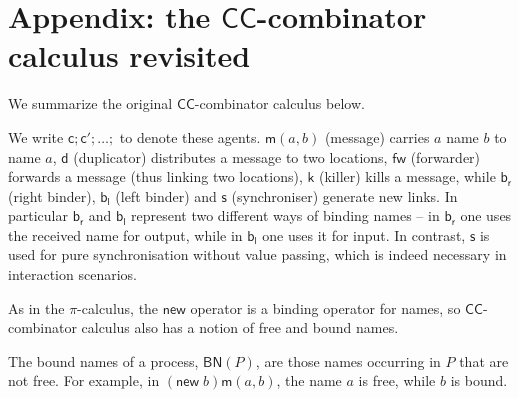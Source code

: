\documentclass[submission,copyright,creativecommons]{eptcs}
\newcommand{\new}{\mathsf{new}}
\newcommand{\pic}{$\pi$-calculus}
\newcommand{\ccomb}{$\mathsf{CC}$-combinator calculus}
\newcommand{\pzero}{\mathbin{0}}
\newcommand{\freenames}[1]{\mathbin{\mathsf{FN}(#1)}}
\newcommand{\boundnames}[1]{\mathbin{\mathsf{BN}(#1)}}
\newcommand{\bc}{\mathbin{\mathbf{::=}}}
\newcommand{\bm}{\mathbin{\mathbf\mid}}
\theoremstyle{definition}
\theoremstyle{remark}
\theoremstyle{remark}
\begin{document}



\section{Appendix: the {\ccomb} revisited} \label{appendix:ccomb}
We summarize the original {\ccomb} \cite{DBLP:journals/tcs/Yoshida02} below.


We write $\mathsf{c};\mathsf{c'};\ldots;$ to denote these
agents. $\mathsf{m}(a,b)$ (message) carries $a$ name $b$ to name $a$,
$\mathsf{d}$ (duplicator) distributes a message to two locations,
$\mathsf{fw}$ (forwarder) forwards a message (thus linking two
locations), $\mathsf{k}$ (killer) kills a message, while
$\mathsf{b}_{\mathsf{r}}$ (right binder), $\mathsf{b}_{\mathsf{l}}$
(left binder) and $\mathsf{s}$ (synchroniser) generate new links. In
particular $\mathsf{b}_{\mathsf{r}}$ and $\mathsf{b}_{\mathsf{l}}$
represent two different ways of binding names – in
$\mathsf{b}_{\mathsf{r}}$ one uses the received name for output, while
in $\mathsf{b}_{\mathsf{l}}$ one uses it for input. In contrast,
$\mathsf{s}$ is used for pure synchronisation without value passing,
which is indeed necessary in interaction scenarios.

As in the {\pic}, the $\new$ operator is a binding operator
for names, so {\ccomb} also has a notion of free and bound names.


The bound names of a process, $\boundnames{P}$, are those names occurring in $P$
that are not free. For example, in $(\new\; b)\mathsf{m}(a,b)$, the name $a$ is free, while $b$ is bound.
\end{document}
